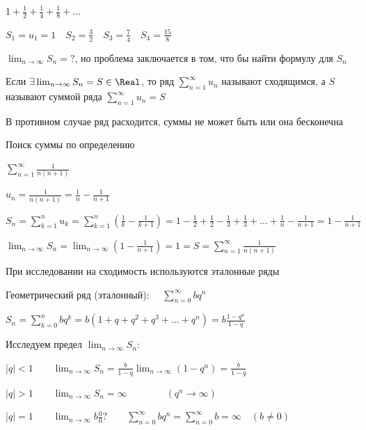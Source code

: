 \documentclass[12pt]{article}
\begin{document}
    \Ex $1 + \frac{1}{2} + \frac{1}{4} + \frac{1}{8} + \dots$

    $S_1 = u_1 = 1 \quad S_2 = \frac{3}{2} \quad S_3 = \frac{7}{4} \quad S_4 = \frac{15}{8}$

    $\lim_{n \to \infty} S_n = ?$, но проблема заключается в том, что бы найти формулу для $S_n$

    \hypertarget{sumofseriesdefinition}{}
    \hypertarget{seriesconvergence}{}

    \Def Если $\exists \lim_{n \to\infty} S_n = S \in \Real$, то ряд $\sum_{n = 1}^\infty u_n$ называют сходящимся,
    а $S$ называют суммой ряда $\sum_{n = 1}^\infty u_n = S$

    \Notas В противном случае ряд расходится, суммы не может быть или она бесконечна

    \Ex Поиск суммы по определению

    $\sum_{n = 1}^\infty \frac{1}{n (n + 1)}$

    $u_n = \frac{1}{n(n + 1)} = \frac{1}{n} - \frac{1}{n + 1}$

    $S_n = \sum_{k = 1}^n u_k = \sum_{k = 1}^n \left(\frac{1}{k} - \frac{1}{k + 1}\right) = 1 - \frac{1}{2} + \frac{1}{2} - \frac{1}{3} + \frac{1}{3} + \dots + \frac{1}{n} - \frac{1}{n + 1} = 1 - \frac{1}{n + 1}$

    $\lim_{n \to \infty} S_n = \lim_{n \to \infty} \left(1 - \frac{1}{n + 1}\right) = 1 = S = \sum_{n = 1}^\infty \frac{1}{n(n + 1)}$

    \hypertarget{referenceseries}{}
    
    \Nota При исследовании на сходимость используются эталонные ряды

    \hypertarget{geometricseries}{}

    \Ex Геометрический ряд (эталонный): \ \ $\sum_{n = 0}^\infty b q^n$

    $S_n = \sum_{k = 0}^n b q^k = b (1 + q + q^2 + q^3 + \dots + q^n) = b \frac{1 - q^n}{1 - q}$

    Исследуем предел $\lim_{n\to\infty} S_n$:

    $|q| < 1 \quad\quad \lim_{n\to\infty} S_n = \frac{b}{1 - q} \lim_{n \to\infty} (1 - q^n) = \frac{b}{1 - q}$

    $|q| > 1 \quad\quad \lim_{n\to\infty} S_n = \infty \qquad\qquad (q^n \to\infty)$

    $|q| = 1 \quad\quad \lim_{n\to\infty} b \frac{0}{0} ? \quad\quad \sum_{n = 0}^\infty b q^n = \sum_{n = 0}^\infty b = \infty \quad (b \neq 0)$
\end{document}
